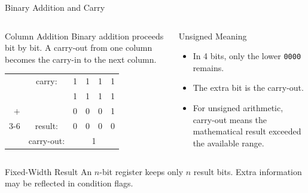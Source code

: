 \documentclass[aspectratio=169,11pt,t]{beamer}
\newcommand{\code}[1]{\texttt{#1}}
\begin{document}
\begin{frame}{Binary Addition and Carry}


\vspace{-0.35cm}
\begin{columns}[T,onlytextwidth]

\begin{block}{Column Addition}
Binary addition proceeds bit by bit. A carry-out from one column becomes the carry-in to the next column.

\vspace{0.08cm}

\begin{center}
\setlength{\tabcolsep}{0.28em}
\renewcommand{\arraystretch}{1.05}
\begin{tabular}{rccccc}
\multicolumn{1}{r}{} & \scriptsize carry: & \scriptsize 1 & \scriptsize 1 & \scriptsize 1 & \scriptsize 1 \\
\multicolumn{1}{r}{} &              & 1 & 1 & 1 & 1 \\
\multicolumn{1}{r}{$+$} &            & 0 & 0 & 0 & 1 \\
\cline{3-6}
\multicolumn{1}{r}{} & \scriptsize result: & 0 & 0 & 0 & 0 \\
\multicolumn{1}{r}{} & \scriptsize carry-out: & \multicolumn{4}{c}{1}
\end{tabular}
\end{center}

\end{block}

\begin{block}{Unsigned Meaning}
\begin{itemize}
\item In 4 bits, only the lower \code{0000} remains.
\item The extra bit is the carry-out.
\item For unsigned arithmetic, carry-out means the mathematical result exceeded the available range.
\end{itemize}
\end{block}

\end{columns}

\vspace{0.05cm}

\begin{block}{Fixed-Width Result}\small
An $n$-bit register keeps only $n$ result bits. Extra information may be reflected in condition flags.
\end{block}

\end{frame}
\end{document}
